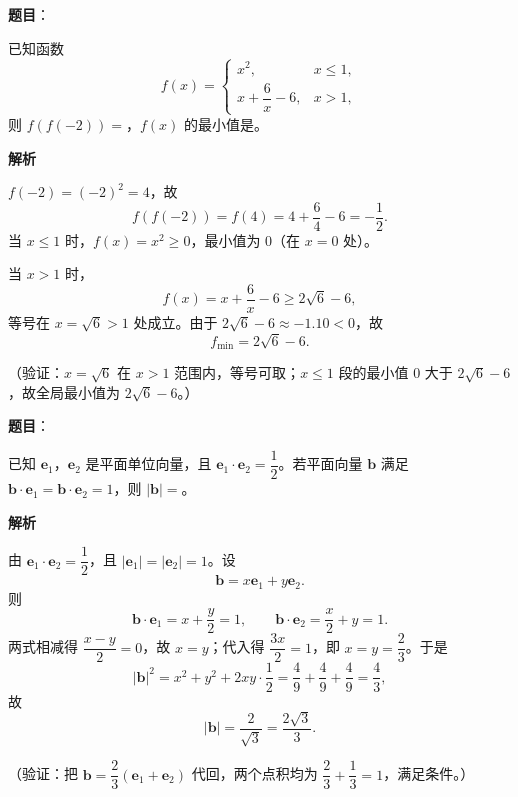 \begin{answer}

\textbf{题目}：

已知函数
\nopagebreak[4]
\[
f(x)=\begin{cases}
x^2, & x\leqslant1,\\
x+\dfrac{6}{x}-6, & x>1,
\end{cases}
\]
则 \(f(f(-2))=\)\gkblank{}，\(f(x)\) 的最小值是\gkblank{}。

\textbf{解析}

\(f(-2)=(-2)^2=4\)，故
\nopagebreak[4]
\[
f(f(-2))=f(4)=4+\frac64-6=-\frac12.
\]
当 \(x\leqslant1\) 时，\(f(x)=x^2\geqslant0\)，最小值为 \(0\)（在 \(x=0\) 处）。

当 \(x>1\) 时，
\nopagebreak[4]
\[
f(x)=x+\frac6x-6\geqslant2\sqrt6-6,
\]
等号在 \(x=\sqrt6>1\) 处成立。由于 \(2\sqrt6-6\approx-1.10<0\)，故
\nopagebreak[4]
\[
f_{\min}=2\sqrt6-6.
\]

（验证：\(x=\sqrt6\) 在 \(x>1\) 范围内，等号可取；\(x\leqslant1\) 段的最小值 \(0\) 大于 \(2\sqrt6-6\)，故全局最小值为 \(2\sqrt6-6\)。）


\end{answer}
\begin{answer}

\textbf{题目}：

已知 \(\boldsymbol{e}_1\)，\(\boldsymbol{e}_2\) 是平面单位向量，且 \(\boldsymbol{e}_1\cdot\boldsymbol{e}_2=\dfrac{1}{2}\)。若平面向量 \(\boldsymbol{b}\) 满足 \(\boldsymbol{b}\cdot\boldsymbol{e}_1=\boldsymbol{b}\cdot\boldsymbol{e}_2=1\)，则 \(|\boldsymbol{b}|=\)\gkblank{}。

\textbf{解析}

由 \(\boldsymbol{e}_1\cdot\boldsymbol{e}_2=\dfrac12\)，且 \(|\boldsymbol{e}_1|=|\boldsymbol{e}_2|=1\)。设
\nopagebreak[4]
\[
\boldsymbol{b}=x\boldsymbol{e}_1+y\boldsymbol{e}_2.
\]
则
\nopagebreak[4]
\[
\boldsymbol{b}\cdot\boldsymbol{e}_1=x+\frac{y}2=1,\qquad
\boldsymbol{b}\cdot\boldsymbol{e}_2=\frac{x}2+y=1.
\]
两式相减得 \(\dfrac{x-y}{2}=0\)，故 \(x=y\)；代入得 \(\dfrac{3x}{2}=1\)，即 \(x=y=\dfrac23\)。于是
\nopagebreak[4]
\[
|\boldsymbol{b}|^2=x^2+y^2+2xy\cdot\frac12
=\frac49+\frac49+\frac49=\frac43,
\]
故
\nopagebreak[4]
\[
|\boldsymbol{b}|=\frac{2}{\sqrt3}=\frac{2\sqrt3}{3}.
\]

（验证：把 \(\boldsymbol{b}=\dfrac23(\boldsymbol{e}_1+\boldsymbol{e}_2)\) 代回，两个点积均为 \(\dfrac23+\dfrac13=1\)，满足条件。）


\end{answer}
